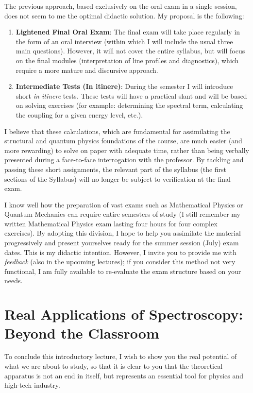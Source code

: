 The previous approach, based exclusively on the oral exam in a single session, does not seem to me the optimal didactic solution. My proposal is the following:
\begin{enumerate}
    \item \textbf{Lightened Final Oral Exam}: The final exam will take place regularly in the form of an oral interview (within which I will include the usual three main questions). However, it will not cover the entire syllabus, but will focus on the final modules (interpretation of line profiles and diagnostics), which require a more mature and discursive approach.
    \item \textbf{Intermediate Tests (In itinere)}: During the semester I will introduce short \textit{in itinere} tests. These tests will have a practical slant and will be based on solving exercises (for example: determining the spectral term, calculating the coupling for a given energy level, etc.).
\end{enumerate}

I believe that these calculations, which are fundamental for assimilating the structural and quantum physics foundations of the course, are much easier (and more rewarding) to solve on paper with adequate time, rather than being verbally presented during a face-to-face interrogation with the professor. By tackling and passing these short assignments, the relevant part of the syllabus (the first sections of the Syllabus) will no longer be subject to verification at the final exam.

I know well how the preparation of vast exams such as Mathematical Physics or Quantum Mechanics can require entire semesters of study (I still remember my written Mathematical Physics exam lasting four hours for four complex exercises). By adopting this division, I hope to help you assimilate the material progressively and present yourselves ready for the summer session (July) exam dates.
This is my didactic intention. However, I invite you to provide me with \textit{feedback} (also in the upcoming lectures); if you consider this method not very functional, I am fully available to re-evaluate the exam structure based on your needs.

\section{Real Applications of Spectroscopy: Beyond the Classroom}

To conclude this introductory lecture, I wish to show you the real potential of what we are about to study, so that it is clear to you that the theoretical apparatus is not an end in itself, but represents an essential tool for physics and high-tech industry.


